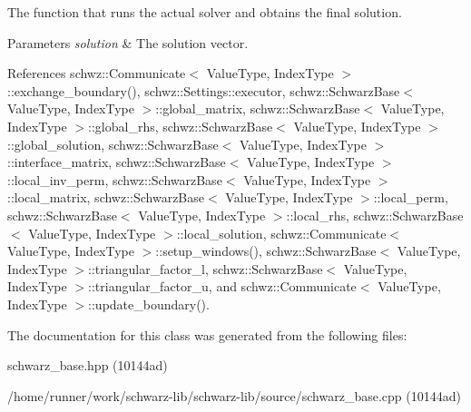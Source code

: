 The function that runs the actual solver and obtains the final solution. 


\begin{DoxyParams}{Parameters}
{\em solution} & The solution vector. \\
\hline
\end{DoxyParams}


References schwz\+::\+Communicate$<$ Value\+Type, Index\+Type $>$\+::exchange\+\_\+boundary(), schwz\+::\+Settings\+::executor, schwz\+::\+Schwarz\+Base$<$ Value\+Type, Index\+Type $>$\+::global\+\_\+matrix, schwz\+::\+Schwarz\+Base$<$ Value\+Type, Index\+Type $>$\+::global\+\_\+rhs, schwz\+::\+Schwarz\+Base$<$ Value\+Type, Index\+Type $>$\+::global\+\_\+solution, schwz\+::\+Schwarz\+Base$<$ Value\+Type, Index\+Type $>$\+::interface\+\_\+matrix, schwz\+::\+Schwarz\+Base$<$ Value\+Type, Index\+Type $>$\+::local\+\_\+inv\+\_\+perm, schwz\+::\+Schwarz\+Base$<$ Value\+Type, Index\+Type $>$\+::local\+\_\+matrix, schwz\+::\+Schwarz\+Base$<$ Value\+Type, Index\+Type $>$\+::local\+\_\+perm, schwz\+::\+Schwarz\+Base$<$ Value\+Type, Index\+Type $>$\+::local\+\_\+rhs, schwz\+::\+Schwarz\+Base$<$ Value\+Type, Index\+Type $>$\+::local\+\_\+solution, schwz\+::\+Communicate$<$ Value\+Type, Index\+Type $>$\+::setup\+\_\+windows(), schwz\+::\+Schwarz\+Base$<$ Value\+Type, Index\+Type $>$\+::triangular\+\_\+factor\+\_\+l, schwz\+::\+Schwarz\+Base$<$ Value\+Type, Index\+Type $>$\+::triangular\+\_\+factor\+\_\+u, and schwz\+::\+Communicate$<$ Value\+Type, Index\+Type $>$\+::update\+\_\+boundary().



The documentation for this class was generated from the following files\+:\begin{DoxyCompactItemize}
\item 
schwarz\+\_\+base.\+hpp (10144ad)\item 
/home/runner/work/schwarz-\/lib/schwarz-\/lib/source/schwarz\+\_\+base.\+cpp (10144ad)\end{DoxyCompactItemize}

